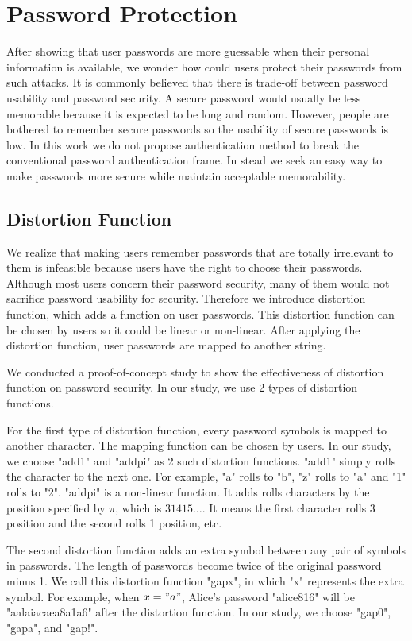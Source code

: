 \section{Password Protection}
\label{passwordprotection}
After showing that user passwords are more guessable when their personal information is available, we wonder how could users protect their passwords from such attacks. It is commonly believed that there is trade-off between password usability and password security. A secure password would usually be less memorable because it is expected to be long and random. However, people are bothered to remember secure passwords so the usability of secure passwords is low. In this work we do not propose authentication method to break the conventional password authentication frame. In stead we seek an easy way to make passwords more secure while maintain acceptable memorability.

\subsection{Distortion Function}
We realize that making users remember passwords that are totally irrelevant to them is infeasible because users have the right to choose their passwords. Although most users concern their password security, many of them would not sacrifice password usability for security. Therefore we introduce distortion function, which adds a function on user passwords. This distortion function can be chosen by users so it could be linear or non-linear. After applying the distortion function, user passwords are mapped to another string. 

We conducted a proof-of-concept study to show the effectiveness of distortion function on password security. In our study, we use 2 types of distortion functions. 

For the first type of distortion function, every password symbols is mapped to another character. The mapping function can be chosen by users. In our study, we choose "add1" and "addpi" as 2 such distortion functions. "add1" simply rolls the character to the next one. For example, "a" rolls to "b", "z" rolls to "a" and "1" rolls to "2". "addpi" is a non-linear function. It adds rolls characters by the position specified by $\pi$, which is $31415 \ldots$. It means the first character rolls 3 position and the second rolls 1 position, etc.

The second distortion function adds an extra symbol between any pair of symbols in passwords. The length of passwords become twice of the original password minus 1. We call this distortion function "gapx", in which "x" represents the extra symbol. For example, when $x = "a"$, Alice's password "alice816" will be "aalaiacaea8a1a6" after the distortion function. In our study, we choose "gap0", "gapa", and "gap!".


